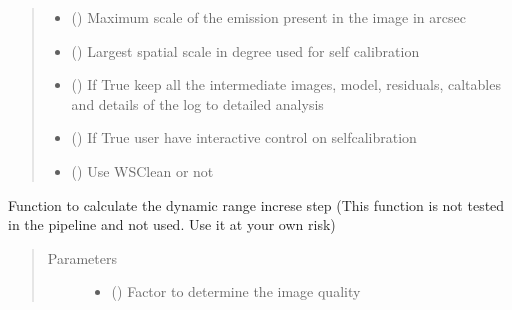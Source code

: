 \documentclass[letterpaper,10pt,english]{sphinxmanual}
\begin{document}
\begin{fulllineitems}
\begin{quote}
\begin{description}
\begin{itemize}
\item {} 
\sphinxAtStartPar
{} () \textendash{} Maximum scale of the emission present in the image in arcsec

\item {} 
\sphinxAtStartPar
{} () \textendash{} Largest spatial scale in degree used for self calibration

\item {} 
\sphinxAtStartPar
{} () \textendash{} If True keep all the intermediate images, model, residuals, caltables and details of the log to detailed analysis

\item {} 
\sphinxAtStartPar
{} () \textendash{} If True user have interactive control on self\sphinxhyphen{}calibration

\item {} 
\sphinxAtStartPar
{} () \textendash{} Use WSClean or not

\end{itemize}

\end{description}\end{quote}

\begin{fulllineitems}
\label{\detokenize{paircars:paircars.intensity_selfcal_LTS.IntensitySelfcal.DR_delta}}
\sphinxAtStartPar
Function to calculate the dynamic range increse step
(This function is not tested in the pipeline and not used. Use it at your own risk)
\begin{quote}\begin{description}
\item[{Parameters}] \leavevmode\begin{itemize}
\item {} 
\sphinxAtStartPar
{} () \textendash{} Factor to determine the image quality


\end{itemize}
\end{description}
\end{quote}
\end{fulllineitems}
\end{fulllineitems}
\end{document}
